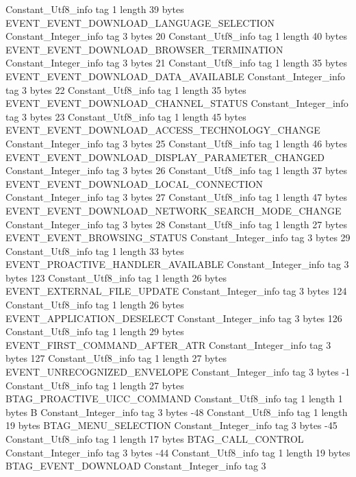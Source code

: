 {{{		}
		Constant_Utf8_info {
			tag	1
			length	39
			bytes	EVENT_EVENT_DOWNLOAD_LANGUAGE_SELECTION
		}
		Constant_Integer_info {
			tag	3
			bytes	20
		}
		Constant_Utf8_info {
			tag	1
			length	40
			bytes	EVENT_EVENT_DOWNLOAD_BROWSER_TERMINATION
		}
		Constant_Integer_info {
			tag	3
			bytes	21
		}
		Constant_Utf8_info {
			tag	1
			length	35
			bytes	EVENT_EVENT_DOWNLOAD_DATA_AVAILABLE
		}
		Constant_Integer_info {
			tag	3
			bytes	22
		}
		Constant_Utf8_info {
			tag	1
			length	35
			bytes	EVENT_EVENT_DOWNLOAD_CHANNEL_STATUS
		}
		Constant_Integer_info {
			tag	3
			bytes	23
		}
		Constant_Utf8_info {
			tag	1
			length	45
			bytes	EVENT_EVENT_DOWNLOAD_ACCESS_TECHNOLOGY_CHANGE
		}
		Constant_Integer_info {
			tag	3
			bytes	25
		}
		Constant_Utf8_info {
			tag	1
			length	46
			bytes	EVENT_EVENT_DOWNLOAD_DISPLAY_PARAMETER_CHANGED
		}
		Constant_Integer_info {
			tag	3
			bytes	26
		}
		Constant_Utf8_info {
			tag	1
			length	37
			bytes	EVENT_EVENT_DOWNLOAD_LOCAL_CONNECTION
		}
		Constant_Integer_info {
			tag	3
			bytes	27
		}
		Constant_Utf8_info {
			tag	1
			length	47
			bytes	EVENT_EVENT_DOWNLOAD_NETWORK_SEARCH_MODE_CHANGE
		}
		Constant_Integer_info {
			tag	3
			bytes	28
		}
		Constant_Utf8_info {
			tag	1
			length	27
			bytes	EVENT_EVENT_BROWSING_STATUS
		}
		Constant_Integer_info {
			tag	3
			bytes	29
		}
		Constant_Utf8_info {
			tag	1
			length	33
			bytes	EVENT_PROACTIVE_HANDLER_AVAILABLE
		}
		Constant_Integer_info {
			tag	3
			bytes	123
		}
		Constant_Utf8_info {
			tag	1
			length	26
			bytes	EVENT_EXTERNAL_FILE_UPDATE
		}
		Constant_Integer_info {
			tag	3
			bytes	124
		}
		Constant_Utf8_info {
			tag	1
			length	26
			bytes	EVENT_APPLICATION_DESELECT
		}
		Constant_Integer_info {
			tag	3
			bytes	126
		}
		Constant_Utf8_info {
			tag	1
			length	29
			bytes	EVENT_FIRST_COMMAND_AFTER_ATR
		}
		Constant_Integer_info {
			tag	3
			bytes	127
		}
		Constant_Utf8_info {
			tag	1
			length	27
			bytes	EVENT_UNRECOGNIZED_ENVELOPE
		}
		Constant_Integer_info {
			tag	3
			bytes	-1
		}
		Constant_Utf8_info {
			tag	1
			length	27
			bytes	BTAG_PROACTIVE_UICC_COMMAND
		}
		Constant_Utf8_info {
			tag	1
			length	1
			bytes	B
		}
		Constant_Integer_info {
			tag	3
			bytes	-48
		}
		Constant_Utf8_info {
			tag	1
			length	19
			bytes	BTAG_MENU_SELECTION
		}
		Constant_Integer_info {
			tag	3
			bytes	-45
		}
		Constant_Utf8_info {
			tag	1
			length	17
			bytes	BTAG_CALL_CONTROL
		}
		Constant_Integer_info {
			tag	3
			bytes	-44
		}
		Constant_Utf8_info {
			tag	1
			length	19
			bytes	BTAG_EVENT_DOWNLOAD
		}
		Constant_Integer_info {
			tag	3
}}}
